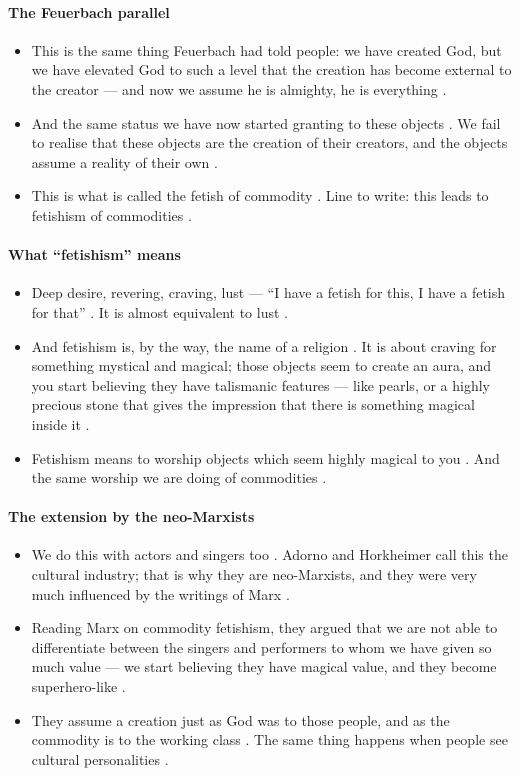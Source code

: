 \paragraph{The Feuerbach parallel}
\begin{itemize}
    \item This is the same thing Feuerbach had told people: we have created God, but we have elevated God to such a level that the creation has become external to the creator --- and now we assume he is almighty, he is everything .
    \item And the same status we have now started granting to these objects . We fail to realise that these objects are the creation of their creators, and the objects assume a reality of their own .
    \item This is what is called the fetish of commodity . Line to write: this leads to fetishism of commodities .
\end{itemize}

\paragraph{What ``fetishism'' means}
\begin{itemize}
    \item Deep desire, revering, craving, lust --- ``I have a fetish for this, I have a fetish for that'' . It is almost equivalent to lust .
    \item And fetishism is, by the way, the name of a religion . It is about craving for something mystical and magical; those objects seem to create an aura, and you start believing they have talismanic features --- like pearls, or a highly precious stone that gives the impression that there is something magical inside it .
    \item Fetishism means to worship objects which seem highly magical to you . And the same worship we are doing of commodities .
\end{itemize}

\paragraph{The extension by the neo-Marxists}
\begin{itemize}
    \item We do this with actors and singers too . Adorno and Horkheimer call this the cultural industry; that is why they are neo-Marxists, and they were very much influenced by the writings of Marx .
    \item Reading Marx on commodity fetishism, they argued that we are not able to differentiate between the singers and performers to whom we have given so much value --- we start believing they have magical value, and they become superhero-like .
    \item They assume a creation just as God was to those people, and as the commodity is to the working class . The same thing happens when people see cultural personalities .
\end{itemize}

